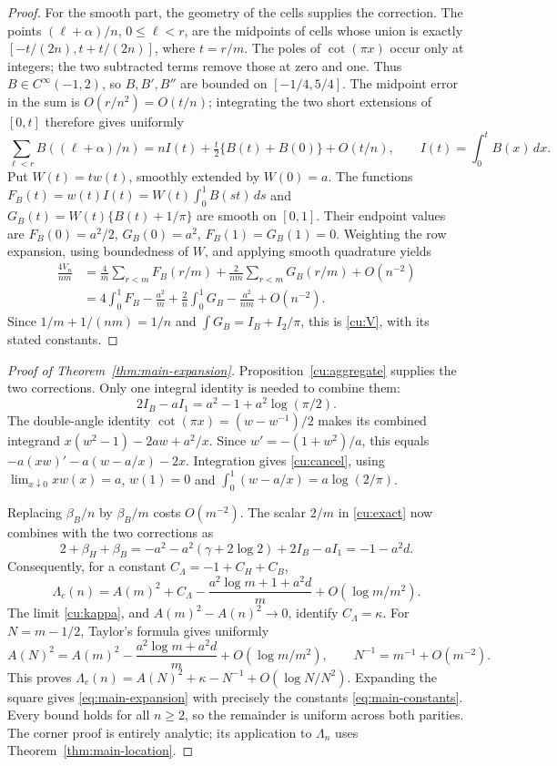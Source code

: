 \begin{proof}
For the smooth part, the geometry of the cells supplies the correction.
The points $(\ell+\alpha)/n$, $0\leq\ell<r$, are the midpoints of
cells whose union is exactly $[-t/(2n),t+t/(2n)]$, where $t=r/m$.
The poles of $\cot(\pi x)$ occur only at integers; the two subtracted
terms remove those at zero and one. Thus $B\in C^\infty(-1,2)$,
so $B,B',B''$ are bounded on $[-1/4,5/4]$.
The midpoint error in the sum is $O(r/n^2)=O(t/n)$; integrating the two
short extensions of $[0,t]$ therefore gives uniformly
\[
 \sum_{\ell<r}B((\ell+\alpha)/n)
   =nI(t)+\tfrac t2\{B(t)+B(0)\}+O(t/n),\qquad I(t)=\int_0^tB(x)\,dx.
\]
Put $W(t)=tw(t)$, smoothly extended by $W(0)=a$.
The functions $F_B(t)=w(t)I(t)=W(t)\int_0^1B(st)\,ds$ and
$G_B(t)=W(t)\{B(t)+1/\pi\}$ are smooth on $[0,1]$.
Their endpoint values are $F_B(0)=a^2/2$, $G_B(0)=a^2$,
$F_B(1)=G_B(1)=0$. Weighting the row expansion, using boundedness
of $W$, and applying smooth quadrature yields
\[
 \begin{aligned}
 \frac{4V_n}{nm}
 &=\frac4m\sum_{r<m}F_B(r/m)+\frac2{nm}\sum_{r<m}G_B(r/m)+O(n^{-2})\\
 &=4\int_0^1F_B-\frac{a^2}{m}
       +\frac2n\int_0^1G_B-\frac{a^2}{nm}+O(n^{-2}).
 \end{aligned}
\]
Since $1/m+1/(nm)=1/n$ and $\int G_B=I_B+I_2/\pi$, this is
\eqref{cu:V}, with its stated constants.
\end{proof}

\begin{proof}[Proof of Theorem~\ref{thm:main-expansion}]
Proposition~\ref{cu:aggregate} supplies the two corrections. Only one
integral identity is needed to combine them:
\begin{equation}\label{cu:cancel}
 2I_B-aI_1=a^2-1+a^2\log(\pi/2).
\end{equation}
The double-angle identity $\cot(\pi x)=(w-w^{-1})/2$ makes its
combined integrand $x(w^2-1)-2aw+a^2/x$.
Since $w'=-(1+w^2)/a$, this equals
$-a(xw)'-a(w-a/x)-2x$. Integration gives \eqref{cu:cancel}, using
$\lim_{x\downarrow0}xw(x)=a$, $w(1)=0$ and
$\int_0^1(w-a/x)=a\log(2/\pi)$.

Replacing $\beta_B/n$ by $\beta_B/m$ costs $O(m^{-2})$.
The scalar $2/m$ in \eqref{cu:exact} now combines with the two
corrections as
\[
 2+\beta_H+\beta_B
 =-a^2-a^2(\gamma+2\log2)+2I_B-aI_1=-1-a^2d.
\]
Consequently, for a constant $C_\Lambda=-1+C_H+C_B$,
\[
 \Lambda_c(n)=A(m)^2+C_\Lambda-
       \frac{a^2\log m+1+a^2d}{m}+O(\log m/m^2).
\]
The limit \eqref{cu:kappa}, and $A(m)^2-A(n)^2\to0$, identify $C_\Lambda=\kappa$.
For $N=m-1/2$, Taylor's formula gives uniformly
\[
 A(N)^2=A(m)^2-\frac{a^2\log m+a^2d}{m}+O(\log m/m^2),
 \qquad N^{-1}=m^{-1}+O(m^{-2}).
\]
This proves $\Lambda_c(n)=A(N)^2+\kappa-N^{-1}+O(\log N/N^2)$.
Expanding the square gives \eqref{eq:main-expansion} with precisely the
constants \eqref{eq:main-constants}. Every bound holds for all $n\geq2$,
so the remainder is uniform across both parities. The corner proof is
entirely analytic; its application to $\Lambda_n$ uses
Theorem~\ref{thm:main-location}.
\end{proof}
